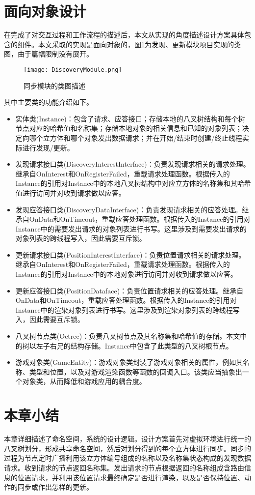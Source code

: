 \section{面向对象设计}
\par
在完成了对交互过程和工作流程的描述后，本文从实现的角度描述设计方案具体包含的组件。本文采取的实现是面向对象的，图\ref{fig:DIscoveryModuleClassDiagram}为发现、更新模块项目实现的类图，由于篇幅限制没有展开。
\begin{figure}[h!]
	\centering
	\texttt{[image: DiscoveryModule.png]}
	\caption{同步模块的类图描述}
	\label{fig:DIscoveryModuleClassDiagram}
\end{figure}
\par
其中主要类的功能介绍如下。
\begin{itemize}
\item
实体类(Instance)：包含了请求、应答接口；存储本地的八叉树结构和每个树节点对应的哈希值和名称集；存储本地对象的相关信息和已知的对象列表；决定向哪个立方体和哪个对象发出数据请求；并在开始/结束时创建/终止线程实际进行发现/更新。
\item
发现请求接口类(DiscoveryInterestInterface)：负责发现请求相关的请求处理。继承自OnInterest和OnRegisterFailed，重载请求处理函数。根据传入的Instance的引用对Instance中的本地八叉树结构中对应立方体的名称集和其哈希值进行访问并对收到请求做以应答。
\item
发现应答接口类(DiscoveryDataInterface)：负责发现请求相关的应答处理。继承自OnData和OnTimeout，重载应答处理函数。根据传入的Instance的引用对Instance中的需要发出请求的对象列表进行书写。这里涉及到需要发出请求的对象列表的跨线程写入，因此需要互斥锁。
\item
更新请求接口类(PositionInterestInterface)：负责位置请求相关的请求处理。继承自OnInterest和OnRegisterFailed，重载请求处理函数。根据传入的Instance的引用对Instance中的本地对象进行访问并对收到请求做以应答。
\item
更新应答接口类(PositionDataface)：负责位置请求相关的应答处理。继承自OnData和OnTimeout，重载应答处理函数。根据传入的Instance的引用对Instance中的渲染对象列表进行书写。这里涉及到渲染对象列表的跨线程写入，因此需要互斥锁。
\item
八叉树节点类(Octree)：负责八叉树节点及其名称集和哈希值的存储。本文中的树以左子右兄的结构存储。Instance中包含了此类型的八叉树根节点。
\item
游戏对象类(GameEntity)：游戏对象类封装了游戏对象相关的属性，例如其名称、类型和位置，以及对游戏渲染函数等函数的回调入口。该类应当抽象出一个对象类，从而降低和游戏应用的耦合度。
\end{itemize}
\section{本章小结}
本章详细描述了命名空间，系统的设计逻辑。设计方案首先对虚拟环境进行统一的八叉树划分，形成共享命名空间，然后对划分得到的每个立方体进行同步。同步的过程为节点定时广播利用该立方体编号组成的名称以及名称集状态构成的发现数据请求。收到请求的节点返回名称集。发出请求的节点根据返回的名称组成含路由信息的位置请求，并利用该位置请求最终确定是否进行渲染，以及是否保持位置、动作的同步或作出怎样的更新。
